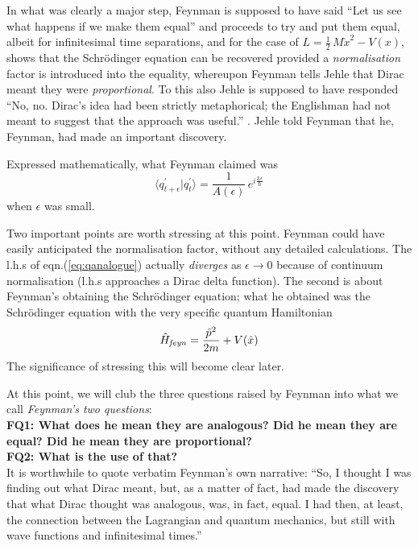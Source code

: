 \documentclass[12pt]{article}
\newcommand{\be}{\begin{equation}}
\newcommand{\ee}{\end{equation}}
\begin{document}
In what was clearly a major step, Feynman is supposed to have said ``Let us see what happens if we make them equal'' and proceeds to try 
and put them equal, albeit for infinitesimal time separations, and
for the case of $L = \frac{1}{2}\,M{\dot x}^2 - V(x)$, shows that the Schr\"odinger equation can be recovered provided a 
{\it normalisation} factor is introduced into the equality, whereupon Feynman tells Jehle that Dirac meant they were {\it proportional}. To
this also Jehle is supposed to have responded ``No, no. Dirac's idea had been strictly metaphorical; the Englishman had not meant to
suggest that the approach was useful.'' \cite{gleick}. Jehle told Feynman that he, Feynman, had made an important discovery.

Expressed mathematically, what Feynman claimed was
\be
\label{eq:missinglink0}
\langle q_{t + \epsilon}^\prime|q_t^\prime\rangle = \frac{1}{A(\epsilon)}\,e^{i \frac{L \epsilon}{\hbar}}
\ee
when $\epsilon$ was small.


Two important points are worth stressing at this point. Feynman could have easily anticipated the normalisation factor, without any
detailed calculations. The l.h.s of eqn.(\ref{eq:qanalogue}) actually \emph{diverges} as $\epsilon \rightarrow 0$ because of continuum 
normalisation (l.h.s approaches a Dirac delta function). The second is about Feynman's obtaining the Schr\"odinger equation; what he obtained
was the Schr\"odinger equation with the very specific quantum Hamiltonian
\be
\label{eq:feynHq}
{\hat H}_{\it feyn} = \frac{{\hat p}^2}{2m} + V({\hat x})
\ee
The significance of stressing this will become clear later.

At this point, we will club the three questions raised by Feynman into what we call \emph{Feynman's two questions}:\\
{\bf FQ1: What does he mean they are analogous? Did he mean they are equal? Did he mean they are proportional?}\\
{\bf FQ2: What is the use of that?}\\

It is worthwhile to quote verbatim Feynman's own narrative: ``So, I thought I was finding out what Dirac meant, but, as a matter of fact, 
had made the discovery that what Dirac thought was analogous, was, in fact, equal. I had then, at least, the connection between the 
Lagrangian and quantum mechanics, but still with wave functions and infinitesimal times.'' \cite{nobel}
\end{document}
